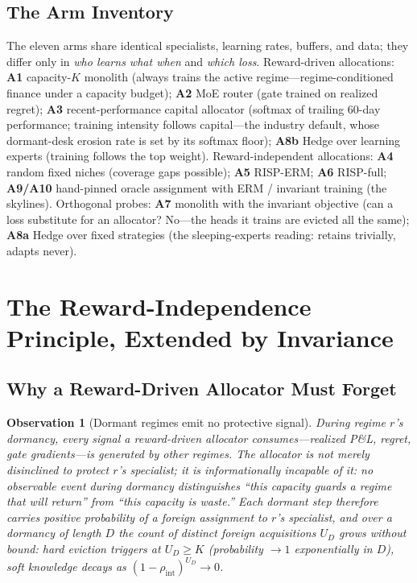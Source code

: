 \documentclass[10pt]{article}
\newtheorem{observation}{Observation}
\newcommand{\nm}{\textsc{RISP}}
\begin{document}
\subsection{The Arm Inventory}

The eleven arms share identical specialists, learning rates, buffers, and
data; they differ only in \emph{who learns what when} and \emph{which
loss}. Reward-driven allocations: \textbf{A1} capacity-$K$ monolith
(always trains the active regime---regime-conditioned finance under a
capacity budget); \textbf{A2} MoE router (gate trained on realized
regret); \textbf{A3} recent-performance capital allocator (softmax of
trailing 60-day performance; training intensity follows capital---the
industry default, whose dormant-desk erosion rate is set by its softmax
floor); \textbf{A8b} Hedge over learning experts (training follows the
top weight). Reward-independent allocations: \textbf{A4} random fixed
niches (coverage gaps possible); \textbf{A5} \nm{}-ERM; \textbf{A6}
\nm{}-full; \textbf{A9/A10} hand-pinned oracle assignment with ERM /
invariant training (the skylines). Orthogonal probes: \textbf{A7}
monolith with the invariant objective (can a loss substitute for an
allocator? No---the heads it trains are evicted all the same);
\textbf{A8a} Hedge over fixed strategies (the sleeping-experts reading:
retains trivially, adapts never).

\section{The Reward-Independence Principle, Extended by Invariance}
\label{sec:principle}

\subsection{Why a Reward-Driven Allocator Must Forget}

\begin{observation}[Dormant regimes emit no protective signal]
\label{obs:blind}
During regime $r$'s dormancy, every signal a reward-driven allocator
consumes---realized P\&L, regret, gate gradients---is generated by
\emph{other} regimes. The allocator is not merely disinclined to protect
$r$'s specialist; it is \emph{informationally incapable} of it: no
observable event during dormancy distinguishes ``this capacity guards a
regime that will return'' from ``this capacity is waste.'' Each dormant
step therefore carries positive probability of a foreign assignment to
$r$'s specialist, and over a dormancy of length $D$ the count of distinct
foreign acquisitions $U_D$ grows without bound: hard eviction triggers at
$U_D \ge K$ (probability $\to 1$ exponentially in $D$), soft knowledge
decays as $(1 - \rho_{\mathrm{int}})^{U_D} \to 0$.
\end{observation}
\end{document}
